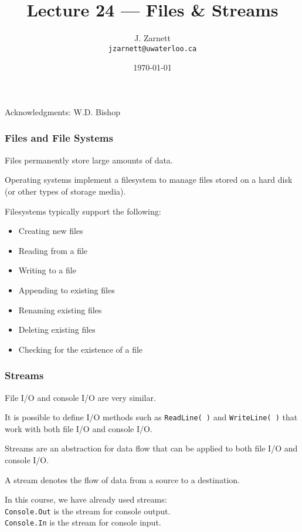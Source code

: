 

\title{Lecture 24 --- Files \& Streams }

\author{J. Zarnett\\
\texttt{jzarnett@uwaterloo.ca}}
\date{\today}



\begin{frame}
  \titlepage
  
  \begin{center}
  \small{Acknowledgments: W.D. Bishop}
  \end{center}
\end{frame}

\begin{frame}
\frametitle{Files and File Systems}

Files permanently store large amounts of data.

Operating systems implement a filesystem to manage files stored on a hard disk (or other types of storage media).

Filesystems typically support the following:
\begin{itemize}
\item Creating new files
\item Reading from a file
\item Writing to a file
\item Appending to existing files
\item Renaming existing files
\item Deleting existing files
\item Checking for the existence of a file
\end{itemize}

\end{frame}

\begin{frame}
\frametitle{Streams}

File I/O and console I/O are very similar.

It is possible to define I/O methods such as \texttt{ReadLine( )} and \texttt{WriteLine( )} that work with both file I/O and console I/O.

\alert{Stream}s are an abstraction for data flow that can be applied to both file I/O and console I/O.

A stream denotes the flow of data from a source to a destination.

In this course, we have already used streams:\\
\quad \texttt{Console.Out} is the stream for console output.\\
\quad \texttt{Console.In} is the stream for console input.


\end{frame}

